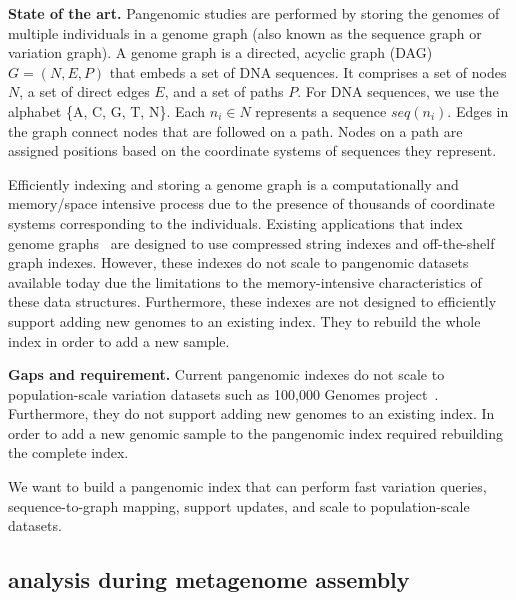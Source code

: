 \noindent
{\bf State of the art.}
Pangenomic studies are performed by storing the genomes of multiple individuals in a genome graph (also known as the sequence graph or variation graph). A genome graph is a directed, acyclic graph (DAG) $G = (N, E, P)$ that embeds a set of DNA sequences. It comprises a set of nodes $N$, a set of direct edges $E$, and a set of paths $P$. For DNA sequences, we use the alphabet \{A, C, G, T, N\}\@. Each $n_i \in N$ represents a sequence $seq(n_i)$. Edges in the graph connect nodes that are followed on a path. Nodes on a path are assigned positions based on the coordinate systems of sequences they represent.

Efficiently indexing and storing a genome graph is a computationally and memory/space intensive process due to the presence of thousands of coordinate systems corresponding to the individuals. Existing applications that index genome graphs~\cite{pandey2021variantstore,garrison2018variation} are designed to use compressed string indexes and off-the-shelf graph indexes. However, these indexes do not scale to pangenomic datasets available today due the limitations to the memory-intensive characteristics of these data structures. Furthermore, these indexes are not designed to efficiently support adding new genomes to an existing index. They to rebuild the whole index in order to add a new sample.

\noindent
{\bf Gaps and requirement.}
Current pangenomic indexes do not scale to population-scale variation datasets such as 100,000 Genomes project~\cite{1002021100}. Furthermore, they do not support adding new genomes to an existing index. In order to add a new genomic sample to the pangenomic index required rebuilding the complete index.

\begin{rproblem}
 We want to build a pangenomic index that can perform fast variation queries, sequence-to-graph mapping, support updates, and scale to population-scale datasets.
\label{rprob:peppermint3}
\end{rproblem}

\subsection{\kmer analysis during metagenome assembly}

